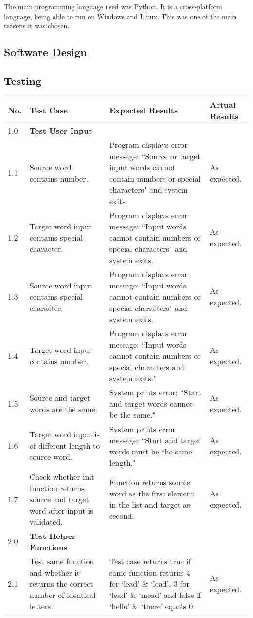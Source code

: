 \documentclass[12pt, a4]{report}
\begin{document}
	\par The main programming language used was Python. It is a cross-platform language, being able to run on Windows and Linux. This was one of the main reasons it was chosen. 

	\pagebreak
	
	\subsection{Software Design}
	\subsubsection{}
	
	
	\pagebreak
	
	
	\subsection{Testing}
	
	
	\begin{tabular}{ |p{0.5cm}|p{5cm}|p{5cm}|p{5cm}| }
		\hline
		No. & Test Case & Expected Results & Actual Results \\
		\hline
		1.0 & \textbf{Test User Input} &  & \\
		1.1 & Source word contains number. & Program displays error message: ``Source or target input words cannot contain numbers or special characters" and system exits. & As expected.\\
		1.2 & Target word input contains special character. & Program displays error message: ``Input words cannot contain numbers or special characters" and system exits. & As expected. \\
		1.3 & Source word input contains special character. & Program displays error message: ``Input words cannot contain numbers or special characters" and system exits. & As expected. \\
		1.4 & Target word input contains number. & Program displays error message: ``Input words cannot contain numbers or special characters and system exits." & As expected. \\
		1.5 & Source and target words are the same. & System prints error: ``Start and target words cannot be the same." & As expected. \\
		1.6 & Target word input is of different length to source word. & System prints error message: ``Start and target words must be the same length." & As expected. \\
		1.7 & Check whether init function returns source and target word after input is validated. & Function returns source word as the first element in the list and target as second. & As expected.\\
		2.0 & \textbf{Test Helper Functions} &  &  \\
		2.1 & Test same function and whether it returns the correct number of identical letters. & Test case returns true if same function returns 4 for `lead' \& `lead', 3 for `lead' \& `mead' and false if `hello' \& `there' equals 0. & As expected. \\
		\hline
	\end{tabular}
	
\end{document}
